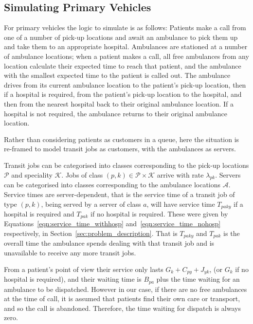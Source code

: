 \documentclass[preprint,12pt]{elsarticle}
\begin{document}
\subsection{Simulating Primary Vehicles}\label{sec:simulation_primary}
For primary vehicles the logic to simulate is as follows: Patients make a call
from one of a number of pick-up locations and await an ambulance to pick them
up and take them to an appropriate hospital. Ambulances are stationed at a
number of ambulance locations; when a patient makes a call, all free
ambulances from any location calculate their expected time to reach that
patient, and the ambulance with the smallest expected time to the patient is
called out. The ambulance drives from its current ambulance location to the
patient's pick-up location, then if a hospital is required, from the patient's
pick-up location to the hospital, and then from the nearest hospital back to
their original ambulance location. If a hospital is not required, the
ambulance returns to their original ambulance location.

Rather than considering patients as customers in a queue, here the situation
is re-framed to model transit jobs as customers, with the ambulances as
servers.

Transit jobs can be categorised into classes corresponding to the pick-up
locations $\mathcal{P}$ and speciality $\mathcal{K}$. Jobs of class
$(p, k) \in \mathcal{P} \times \mathcal{K}$ arrive with rate $\lambda_{pk}$.
Servers can be categorised into classes corresponding to the ambulance
locations $\mathcal{A}$. Service times are server-dependent, that is the
service time of a transit job of type $(p, k)$, being served by a server of
class $a$, will have service time $T_{paky}$ if a hospital is required and
$T_{pak}$ if no hospital is required. These were given by
Equations~\ref{eqn:service_time_withhosp} and~\ref{eqn:service_time_nohosp}
respectively, in Section~\ref{sec:problem_description}.
That is $T_{paky}$ and $T_{pak}$ is the overall time the ambulance spends
dealing with that transit job and is unavailable to receive any more transit
jobs.

From a patient's point of view their service only lasts $G_k + C_{py} + J_{yk}$,
(or $G_k$ if no hospital is required), and their waiting time is $B_{pa}$ plus
the time waiting for an ambulance to be dispatched. However in our case, if
there are no free ambulances at the time of call, it is assumed that patients
find their own care or transport, and so the call is abandoned. Therefore, the
time waiting for dispatch is always zero.
\end{document}
